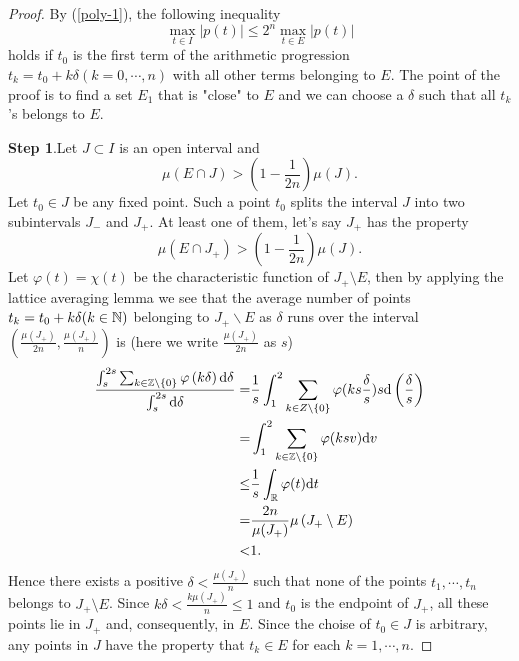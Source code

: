 \begin{proof}
  By (\ref{poly-1}), the following inequality
  \begin{equation}
    \max_{t\in I}\left| p(t) \right| \le 2^{n}\max_{t\in E}\left| p(t) \right| 
  \end{equation}
  holds if $t_0$ is the first term of the arithmetic progression $t_k=t_0+k\delta \left( k=0,\cdots,n \right) $ with all other terms belonging to $E$. The point of the proof is to find a set $E_1$ that is "close" to $E$ and we can choose a $\delta$ such that all $t_k$'s belongs to  $E$.
 
  \textbf{ Step 1}.Let $J \subset I$ is an open interval and
  \[
    \mu\left( E\cap J  \right) >\left( 1-\frac{1}{2n} \right) \mu(J).
  \] 
  Let $t_0\in J$ be any fixed point. Such a point $t_0$ splits the interval  $J$ into two subintervals $J_{-}$ and $J_{+}$. At least one of them, let's say $J_{+}$ has the property
  \[
    \mu\left( E\cap J_{+} \right) >\left( 1-\frac{1}{2n} \right) \mu(J).
  \] 
  Let $\varphi(t)=\chi\left( t \right) $ be the characteristic function of $J_{+}\setminus E$, then by applying the lattice averaging lemma we see that the average number of points  $t_k=t_0+k\delta (k\in \mathbb{N})$ belonging to $J_{+}\backslash E$ as $\delta$ runs over the interval $\left( \frac{\mu(J_{+})}{2n}, \frac{\mu(J_{+})}{n} \right)  $ is (here we write $\frac{\mu(J_{+})}{2n}$ as $s$)
  \begin{equation}
    \begin{aligned}
      \frac{\int_{s}^{2s} \sum_{k\in \mathbb{Z}\setminus \{0\} }\varphi\left( k\delta \right) \mathrm{d}\delta}{\int_{s}^{2s}\mathrm{d}\delta}= & \frac{1}{s}\int_{1}^{2}\sum_{k\in Z\setminus \{0\} }\varphi(ks\frac{\delta}{s})s\mathrm{d}\left( \frac{\delta}{s} \right)\\
      = & \int_1^{2}\sum_{k\in \mathbb{Z}\setminus \{0\} }\varphi(ksv)\mathrm{d}v\\
      \le  & \frac{1}{s}\int_{\mathbb{R}}\varphi(t)\mathrm{d}t\\
      = & \frac{2n}{\mu(J_{+})}\mu\left( J_{+}\setminus E \right)\\
      < & 1.
    \end{aligned}
  \end{equation}
  Hence  there exists a positive $\delta< \frac{\mu(J_{+})}{n}$ such that none of the points $t_1,\cdots,t_n$ belongs to $J_{+}\setminus E$. Since $k \delta< \frac{k\mu(J_{+})}{n}\le 1$ and $t_0$ is the endpoint of $J_{+}$, all these points lie in $J_{+}$ and, consequently, in $E$. Since the choise of $t_0\in  J$ is arbitrary, any points in $J$ have the property that $t_k\in E $ for each $k=1,\cdots,n$.


\end{proof}
